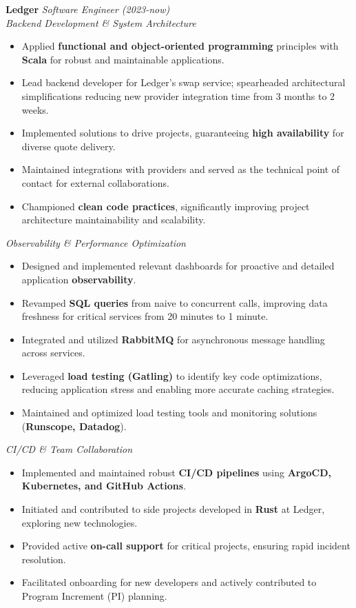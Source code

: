 \documentclass[10pt]{article}
\begin{document}
\textbf{Ledger} \hfill \textit{Software Engineer (2023-now)} \\
\textit{Backend Development \& System Architecture}
\begin{itemize}[leftmargin=*,label=\tiny$\bullet$]
  \item Applied \textbf{functional and object-oriented programming} principles with \textbf{Scala} for robust and maintainable applications.
  \item Lead backend developer for Ledger's swap service; spearheaded architectural simplifications reducing new provider integration time from 3 months to 2 weeks.
  \item Implemented solutions to drive projects, guaranteeing \textbf{high availability} for diverse quote delivery.
  \item Maintained integrations with providers and served as the technical point of contact for external collaborations.
  \item Championed \textbf{clean code practices}, significantly improving project architecture maintainability and scalability.
\end{itemize}
\textit{Observability \& Performance Optimization}
\begin{itemize}[leftmargin=*,label=\tiny$\bullet$]
  \item Designed and implemented relevant dashboards for proactive and detailed application \textbf{observability}.
  \item Revamped \textbf{SQL queries} from naive to concurrent calls, improving data freshness for critical services from 20 minutes to 1 minute.
  \item Integrated and utilized \textbf{RabbitMQ} for asynchronous message handling across services.
  \item Leveraged \textbf{load testing (Gatling)} to identify key code optimizations, reducing application stress and enabling more accurate caching strategies.
  \item Maintained and optimized load testing tools and monitoring solutions (\textbf{Runscope, Datadog}).
\end{itemize}
\textit{CI/CD \& Team Collaboration}
\begin{itemize}[leftmargin=*,label=\tiny$\bullet$]
  \item Implemented and maintained robust \textbf{CI/CD pipelines} using \textbf{ArgoCD, Kubernetes, and GitHub Actions}.
  \item Initiated and contributed to side projects developed in \textbf{Rust} at Ledger, exploring new technologies.
  \item Provided active \textbf{on-call support} for critical projects, ensuring rapid incident resolution.
  \item Facilitated onboarding for new developers and actively contributed to Program Increment (PI) planning.
\end{itemize}
\vspace{0.5em}
\end{document}
